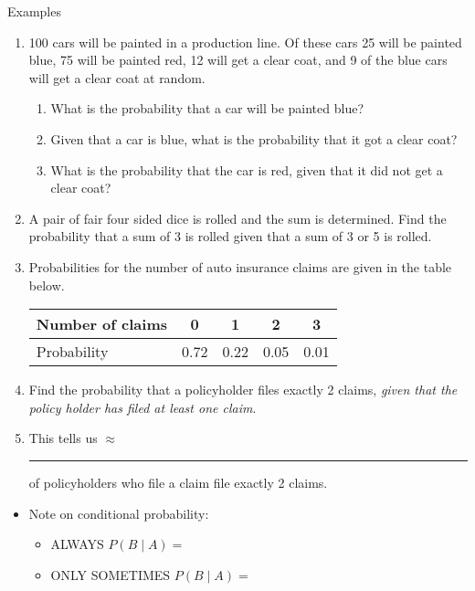 \documentclass{article}
\newcommand{\blankul}[1]{\rule[-1.5mm]{#1}{0.15mm}}	%
\begin{document}
Examples\bigskip
\begin{enumerate}
    \item 100 cars will be painted in a production line. Of these cars 25 will be painted blue, 75 will be painted red, 12 will get a clear coat, and 9 of the blue cars will get a clear coat at random.\vspace{70pt}
    \begin{enumerate}
        \item What is the probability that a car will be painted blue?\vspace{30pt}
        \item Given that a car is blue, what is the probability that it got a clear coat?\vspace{30pt}
        \item What is the probability that the car is red, given that it did not get a clear coat?\vspace{30pt}
    \end{enumerate}
    \item A pair of fair four sided dice is rolled and the sum is determined. Find the probability that a sum of 3 is rolled given that a sum of 3 or 5 is rolled.\vspace{120pt}
    \item Probabilities for the number of auto insurance claims are given in the table below.\\
    \begin{center}
        \begin{tabular}{| l || c | c | c | c |}
        \hline
        Number of claims & 0 & 1 & 2 & 3\\
        \hline
        Probability & 0.72 & 0.22 & 0.05 & 0.01\\
        \hline
        \end{tabular}
    \end{center}\bigskip
    \item[] Find the probability that a policyholder files exactly 2 claims, \textit{given that the policy holder has filed at least one claim}.\vspace{120pt}
    \item[] This tells us $\approx$ \blankul{1cm} of policyholders who file a claim file exactly 2 claims.
\end{enumerate}\bigskip

\begin{itemize}
    \item Note on conditional probability:\\
    \begin{itemize}
        \item ALWAYS $P(B \mid A) = $\\
        \item ONLY SOMETIMES $P(B \mid A) = $\\
    \end{itemize}
\end{itemize}
\end{document}
